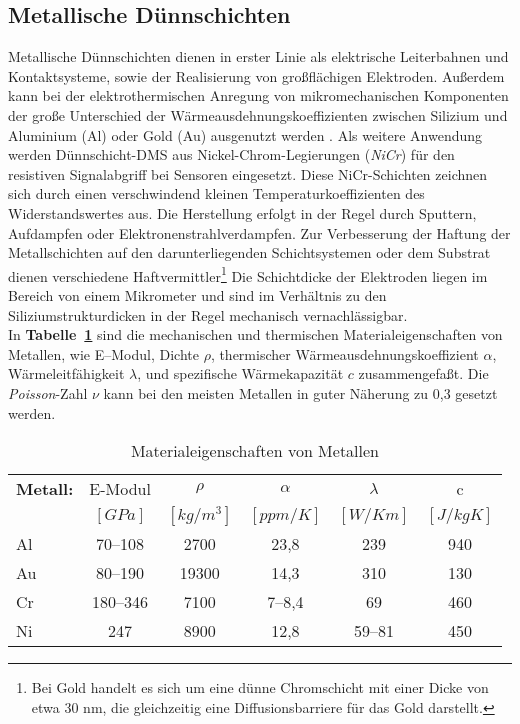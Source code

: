 \subsection{Metallische Dünnschichten}

Metallische Dünnschichten dienen in erster Linie als elektrische
Leiterbahnen und Kontaktsysteme, sowie der Realisierung von
großflächigen Elektroden.  Außerdem kann bei der elektrothermischen
Anregung von mikromechanischen Komponenten der große Unterschied der
Wärmeausdehnungskoeffizienten zwischen Silizium und Aluminium (Al) oder
Gold (Au) ausgenutzt werden \cite{Rie88}.  Als weitere Anwendung werden
Dünnschicht-DMS aus Nickel-Chrom-Legierungen ({\em NiCr}) für den
resistiven Signalabgriff bei Sensoren eingesetzt. Diese NiCr-Schichten
zeichnen sich durch einen verschwindend kleinen Temperaturkoeffizienten
des Widerstandswertes aus. Die
Herstellung erfolgt in der Regel durch Sputtern, Aufdampfen oder
Elektronenstrahlverdampfen. Zur Verbesserung der Haftung der
Metallschichten auf den darunterliegenden Schichtsystemen oder dem Substrat
dienen verschiedene \glqq Haftvermittler\grqq\footnote{Bei Gold handelt
es sich um eine dünne Chromschicht mit einer Dicke von etwa 30 nm, die
gleichzeitig eine Diffusionsbarriere für das Gold darstellt.}
Die Schichtdicke der Elektroden liegen im Bereich von einem Mikrometer
und sind im Verhältnis zu den Siliziumstrukturdicken in der Regel
mechanisch vernachlässigbar.\\
In {\bf Tabelle~\ref{tabmetalle}} sind die mechanischen und thermischen
Materialeigenschaften von Metallen, wie E--Modul, Dichte $\rho$,
thermischer Wärmeausdehnungskoeffizient $\alpha$, Wärmeleitfähigkeit
$\lambda$, und spezifische Wärmekapazität $c$ zusammengefaßt.
Die {\sl Poisson}-Zahl $\nu$ kann bei den meisten Metallen in guter
Näherung zu 0,3 gesetzt werden.
\begin{table}[htb]
\caption{\label{tabmetalle}
 Materialeigenschaften von Metallen}
\begin{center}
\begin{tabular}{|l||c|c|c|c|c|} \hline
{\bf Metall:} & E-Modul & $\rho$   &   $\alpha$  &   $\lambda$  &  c  \\
        & $[GPa]$ & $[kg/m^{3}]$ & $[ppm/K]$ & $ [W/Km] $ & $[J/kgK]$ \\
\hline \hline
Al      & 70--108  & 2700         & 23,8      &  239    &  940 \\ \hline
Au      & 80--190  & 19300        & 14,3      &  310    &  130 \\ \hline
Cr      & 180--346 & 7100         & 7--8,4    &  69     &  460 \\ \hline
Ni      & 247      & 8900         & 12,8      & 59--81  &  450 \\ \hline
\end{tabular}
\end{center}
\end{table}
